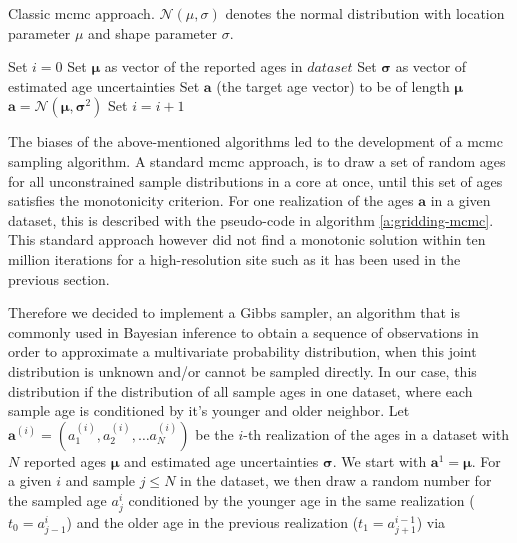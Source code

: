 \begin{refsection}
\begin{algorithm}[h]
\renewcommand{\algorithmicensure}{\textbf{Output:}}
\caption[Classic MCMC approach]{Classic \gls{mcmc} approach. $\mathcal{N}(\mu, \sigma)$ denotes the normal distribution with location parameter $\mu$ and shape parameter $\sigma$.}
\label{a:gridding-mcmc}
\begin{algorithmic}[1]
	\STATE Set $i = 0$
	\STATE Set $\boldsymbol{\mu}$ as vector of the reported ages in $dataset$
	\STATE Set $\boldsymbol{\sigma}$ as vector of estimated age uncertainties		
	\STATE Set $\mathbf{a}$ (the target age vector) to be of length $\boldsymbol{\mu}$
	\STATE $\mathbf{a} = \mathcal{N}(\boldsymbol{\mu}, \boldsymbol{\sigma}^2)$
	\STATE Set $i = i + 1$
	\ENDWHILE
\end{algorithmic}
\end{algorithm}

The biases of the above-mentioned algorithms led to the development of a \gls{mcmc} sampling algorithm. A standard \gls{mcmc} approach, is to draw a set of random ages for all unconstrained sample distributions in a core at once, until this set of ages satisfies the monotonicity criterion. For one realization of the ages $\mathbf{a}$ in a given dataset, this is described with the pseudo-code in algorithm \ref{a:gridding-mcmc}. This standard approach however did not find a monotonic solution within ten million iterations for a high-resolution site such as it has been used in the previous section. 

Therefore we decided to implement a Gibbs sampler, an algorithm that is commonly used in Bayesian inference to obtain a sequence of observations in order to approximate a multivariate probability distribution, when this joint distribution is unknown and/or cannot be sampled directly. In our case, this distribution if the distribution of all sample ages in one dataset, where each sample age is conditioned by it's younger and older neighbor. Let $\mathbf{a}^{(i)} = \left(a^{(i)}_1, a^{(i)}_2, \ldots a^{(i)}_N \right)$ be the $i$-th realization of the ages in a dataset with $N$ reported ages $\boldsymbol{\mu}$ and estimated age uncertainties $\boldsymbol{\sigma}$. We start with $\mathbf{a}^{1} = \boldsymbol{\mu}$. For a given $i$ and sample $j\leq N$ in the dataset, we then draw a random number for the sampled age $a^{i}_j$ conditioned by the younger age in the same realization ($t_0 = a^{i}_{j-1}$) and the older age in the previous realization ($t_1 = a^{i-1}_{j+1}$) via


\end{refsection}
